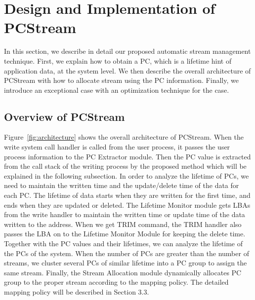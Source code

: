 \section{Design and Implementation of PCStream}
In this section, we describe in detail our proposed automatic stream management technique.
First, we explain how to obtain a PC, which is a lifetime hint of application data, at the system level. 
We then describe the overall architecture of PCStream with how to allocate stream using the PC information. 
Finally, we introduce an exceptional case with an optimization technique for the case.

\subsection{Overview of PCStream}
Figure~\ref{fig:architecture} shows the overall architecture of PCStream.
When the write system call handler is called from the user process,
it passes the user process information to the PC Extractor module.
Then the PC value is extracted from the call stack of the writing process
by the proposed method which will be explained in the following subsection.
In order to analyze the lifetime of PCs,
we need to maintain the written time and the update/delete time of the data for each PC.
The lifetime of data starts when they are written for the first time, 
and ends when they are updated or deleted.
The Lifetime Monitor module gets LBAs from the write handler to 
maintain the written time or update time of the data written to the address.
When we get TRIM command, the TRIM handler also passes the LBA on to the Lifetime Monitor Module
for keeping the delete time.
Together with the PC values and their lifetimes, we can analyze the 
lifetime of the PCs of the system.
When the number of PCs are greater than the number of streams,
we cluster several PCs of similar lifetime into a PC group 
to assign the same stream.
Finally, the Stream Allocation module dynamically allocates PC group
to the proper stream according to the mapping policy.
The detailed mapping policy will be described in Section 3.3.

